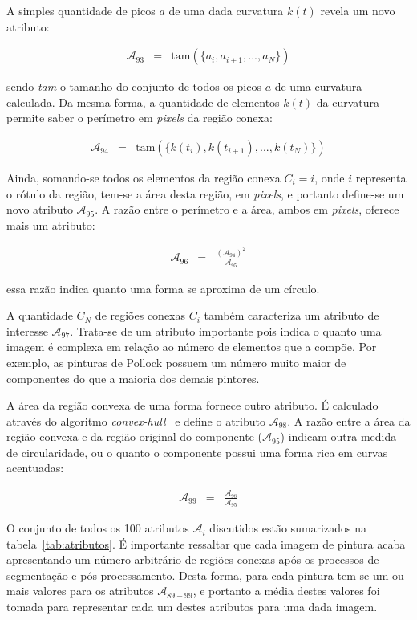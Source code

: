 A simples quantidade de picos $a$ de uma dada curvatura $k(t)$ revela um novo
atributo:

\begin{eqnarray}
  \mathcal{A}_{93} & = & \text{tam}(\{a_{i}, a_{i+1}, ..., a_{N}\})
\end{eqnarray}

\noindent sendo \textit{tam} o tamanho do conjunto de todos os picos $a$ de uma
curvatura calculada. Da mesma forma, a quantidade de elementos $k(t)$ da
curvatura permite saber o perímetro em \textit{pixels} da região conexa:

\begin{eqnarray}
  \mathcal{A}_{94} & = & \text{tam}(\{k(t_{i}), k(t_{i+1}), ..., k(t_{N})\})
\end{eqnarray}

Ainda, somando-se todos os elementos da região conexa $C_i = i$, onde $i$
representa o rótulo da região, tem-se a área desta região, em \textit{pixels}, e portanto
define-se um novo atributo $\mathcal{A}_{95}$. A razão entre o perímetro e a
área, ambos em \textit{pixels}, oferece mais um atributo:

\begin{eqnarray}
  \mathcal{A}_{96} & = & \frac{(\mathcal{A}_{94})^2}{\mathcal{A}_{95}}
\end{eqnarray}

\noindent essa razão indica quanto uma forma se aproxima de um círculo.

A quantidade $C_N$ de regiões conexas $C_i$ também caracteriza um atributo de
interesse $\mathcal{A}_{97}$. Trata-se de um atributo importante pois indica o
quanto uma imagem é complexa em relação ao número de elementos que a compõe. Por exemplo, as pinturas de Pollock possuem um número muito maior de componentes do
que a maioria dos demais pintores.

A área da região convexa de uma forma fornece outro atributo. É calculado
através do algoritmo \textit{convex-hull}~\cite{luciano} e define o atributo
$\mathcal{A}_{98}$. A razão entre a área da região convexa e da região original
do componente ($\mathcal{A}_{95}$) indicam outra medida de circularidade, ou o
quanto o componente possui uma forma rica em curvas acentuadas:

\begin{eqnarray}
  \mathcal{A}_{99} & = & \frac{\mathcal{A}_{98}}{\mathcal{A}_{95}}
\end{eqnarray}

O conjunto de todos os 100 atributos $\mathcal{A}_i$ discutidos estão sumarizados na
tabela~\ref{tab:atributos}. É importante ressaltar que cada imagem de pintura
acaba apresentando um número arbitrário de regiões conexas após os processos de
segmentação e pós-processamento. Desta forma, para cada pintura tem-se um ou
mais valores para os atributos $\mathcal{A}_{89-99}$, e portanto a média destes
valores foi tomada para representar cada um destes atributos para uma dada imagem.

